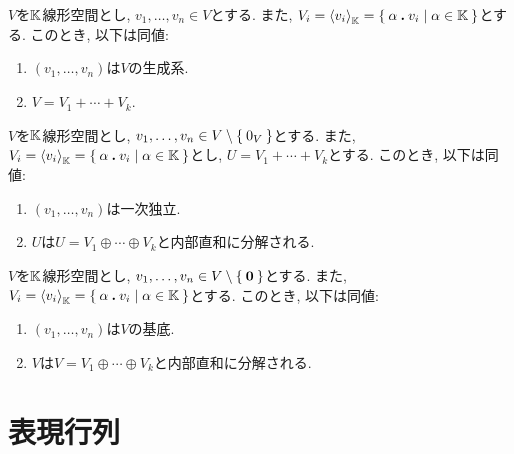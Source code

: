 

\begin{prop}
  $V$を$\mathbb{K}$線形空間とし,
  $v_1,\ldots, v_n\in V$とする.
  また,
  $V_i=\Braket{v_i}_{\mathbb{K}}=\Set{\alpha \mathbin{\boldsymbol{.}}v_i|\alpha \in\mathbb{K}}$とする.
  このとき, 以下は同値:
  \begin{enumerate}
  \item $(v_1,\ldots, v_n)$は$V$の生成系.
  \item $V=V_1+\cdots + V_k$.
  \end{enumerate}
\end{prop}

\begin{prop}
  $V$を$\mathbb{K}$線形空間とし,
  $v_1,\ldots, v_n\in V\setminus\Set{0_V}$とする.
  また,
  $V_i=\Braket{v_i}_{\mathbb{K}}=\Set{\alpha \mathbin{\boldsymbol{.}}v_i|\alpha\in\mathbb{K}}$とし,
  $U=V_1+\cdots + V_k$とする.
  このとき, 以下は同値:
  \begin{enumerate}
  \item $(v_1,\ldots, v_n)$は一次独立.
  \item $U$は$U=V_1\oplus\cdots \oplus V_k$と内部直和に分解される.
  \end{enumerate}
\end{prop}

\begin{prop}
  $V$を$\mathbb{K}$線形空間とし,
  $v_1,\ldots, v_n\in V\setminus\Set{\boldsymbol{0}}$とする.
  また,
  $V_i=\Braket{v_i}_{\mathbb{K}}=\Set{\alpha \mathbin{\boldsymbol{.}}v_i|\alpha \in\mathbb{K}}$とする.
  このとき, 以下は同値:
  \begin{enumerate}
  \item $(v_1,\ldots, v_n)$は$V$の基底.
  \item $V$は$V=V_1\oplus\cdots \oplus V_k$と内部直和に分解される.
  \end{enumerate}
\end{prop}

\begin{quiz}
\end{quiz}




\chapter{表現行列}
\label{chap:repmat}
